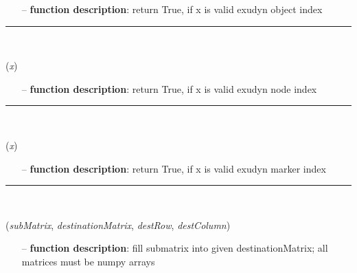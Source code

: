 \begin{itemize}[leftmargin=1.4cm]
\setlength{\itemindent}{0.7cm}
\begin{itemize}[leftmargin=0.7cm]
\item[--]
{\bf function description}: return True, if x is valid exudyn object index
\vspace{12pt}\end{itemize}
%
\noindent\rule{8cm}{0.75pt}\vspace{1pt} \\ 
\begin{flushleft}
\label{sec:advancedUtilities:IsValidNodeIndex}
({\it x})
\end{flushleft}
\setlength{\itemindent}{0.7cm}
\begin{itemize}[leftmargin=0.7cm]
\item[--]
{\bf function description}: return True, if x is valid exudyn node index
\vspace{12pt}\end{itemize}
%
\noindent\rule{8cm}{0.75pt}\vspace{1pt} \\ 
\begin{flushleft}
\label{sec:advancedUtilities:IsValidMarkerIndex}
({\it x})
\end{flushleft}
\setlength{\itemindent}{0.7cm}
\begin{itemize}[leftmargin=0.7cm]
\item[--]
{\bf function description}: return True, if x is valid exudyn marker index
\vspace{12pt}\end{itemize}
%
\noindent\rule{8cm}{0.75pt}\vspace{1pt} \\ 
\begin{flushleft}
\label{sec:advancedUtilities:FillInSubMatrix}
({\it subMatrix}, {\it destinationMatrix}, {\it destRow}, {\it destColumn})
\end{flushleft}
\setlength{\itemindent}{0.7cm}
\begin{itemize}[leftmargin=0.7cm]
\item[--]
{\bf function description}: fill submatrix into given destinationMatrix; all matrices must be numpy arrays

\end{itemize}
\end{itemize}
